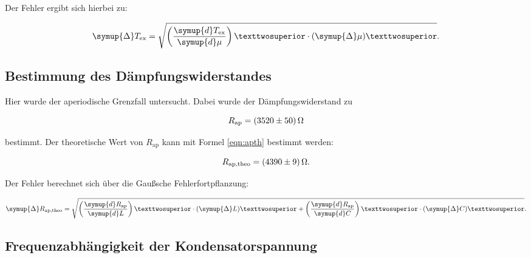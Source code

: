 Der Fehler ergibt sich hierbei zu: 

\begin{equation*}
\symup{\Delta} T_\text{ex} = \sqrt{\left(\frac{\symup{d}T_\text{ex}}{\symup{d}\mu}\right)²\cdot (\symup{\Delta}\mu)²}.
\end{equation*}

\subsection{Bestimmung des Dämpfungswiderstandes}

Hier wurde der aperiodische Grenzfall untersucht. Dabei wurde der
Dämpfungswiderstand zu 

\begin{equation*}
R_\text{ap} = \SI{3520+-50}{\ohm}
\end{equation*}

bestimmt.
Der theoretische Wert von $R_\text{ap}$ kann mit Formel \eqref{eqn:apth} bestimmt 
werden: 

\begin{equation*}
R_\text{ap,theo} = \SI{4390+-9}{\ohm}.
\end{equation*}

Der Fehler berechnet sich über die Gaußsche Fehlerfortpflanzung: 

\begin{equation*}
\symup{\Delta} R_\text{ap,theo} = \sqrt{\left(\frac{\symup{d}R_\text{ap}}{\symup{d}L}\right)²\cdot (\symup{\Delta}L)² +
\left(\frac{\symup{d}R_\text{ap}}{\symup{d}C}\right)²\cdot (\symup{\Delta}C)²}.
\end{equation*}

\subsection{Frequenzabhängigkeit der Kondensatorspannung}

